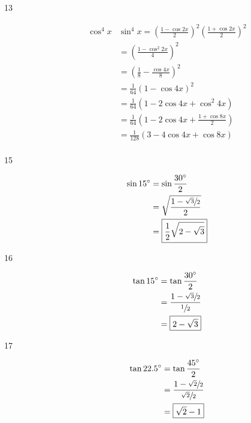 \documentclass{exam}
\newcommand{\dg}{\ensuremath{^\circ}}
\begin{document}
\begin{description}
      \item[13]
        \begin{align*}
          \cos^4 x & \sin^4 x = \left( \frac{1 - \cos 2x}{2} \right)^2 \left( \frac{1 + \cos 2x}{2} \right)^2 \\
                   & = \left( \frac{1 - \cos^2 2x}{4} \right)^2 \\
                   & = \left( \frac{1}{8} - \frac{\cos 4x}{8} \right)^2 \\
                   & = \frac{1}{64} \left( 1 - \cos 4x \right)^2 \\
                   & = \frac{1}{64} \left( 1 - 2 \cos 4x + \cos^2 4x \right) \\
                   & = \frac{1}{64} \left( 1 - 2 \cos 4x + \frac{1 + \cos 8x}{2} \right) \\
                   & = \boxed{ \frac{1}{128} \left( 3 - 4 \cos 4x + \cos 8x \right) } \\
        \end{align*}

      \item[15]
        \begin{align*}
          \sin 15 \dg & = \sin \frac{30 \dg}{2} \\
                      & = \sqrt{  \frac{1 - \sfrac{\sqrt{3}}{2}}{2} } \\
                      & = \boxed{ \frac{1}{2} \sqrt{2 - \sqrt{3}} } \\
        \end{align*}

      \item[16]
        \begin{align*}
          \tan 15 \dg & = \tan \frac{30 \dg}{2} \\
                      & = \frac{ 1 - \sfrac{\sqrt{3}}{2} }{ \sfrac{1}{2} } \\
                      & = \boxed{ 2 - \sqrt{3} } \\
        \end{align*}

      \item[17]
        \begin{align*}
          \tan 22.5 \dg & = \tan \frac{45 \dg}{2} \\
                        & = \frac{1 - \sfrac{\sqrt{2}}{2}}{\sfrac{\sqrt{2}}{2}} \\
                        & = \boxed{ \sqrt{2} - 1 } \\
        \end{align*}


\end{description}
\end{document}

